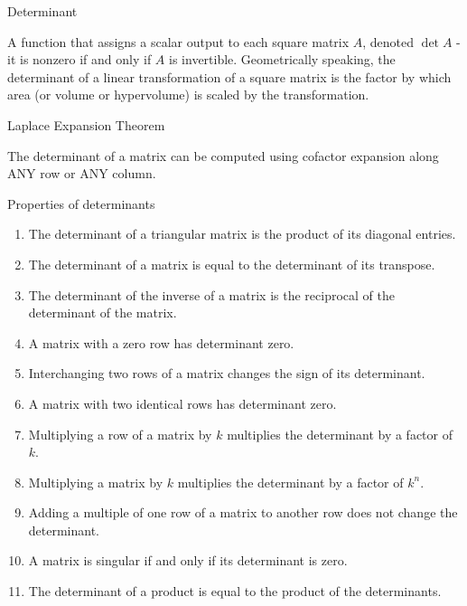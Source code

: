 \documentclass{ximera}
\begin{document}
Determinant
\begin{expandable}
    A function that assigns a scalar output to each square matrix $A$, denoted $\det A$ - it is nonzero if and only if $A$ is invertible.  Geometrically speaking, the determinant of a linear transformation of a square matrix is the factor by which area (or volume or hypervolume) is scaled by the transformation.
\end{expandable}


Laplace Expansion Theorem
\begin{expandable}
    The determinant of a matrix can be computed using cofactor expansion along ANY row or ANY column.
\end{expandable}


Properties of determinants
\begin{expandable}
\begin{enumerate}
    \item The determinant of a triangular matrix is the product of its diagonal entries.

    \item The determinant of a matrix is equal to the determinant of its transpose.

    \item The determinant of the inverse of a matrix is the reciprocal of the determinant of the matrix.

    \item A matrix with a zero row has determinant zero.

    \item Interchanging two rows of a matrix changes the sign of its determinant.

    \item A matrix with two identical rows has determinant zero.

    \item Multiplying a row of a matrix by $k$ multiplies the determinant by a factor of $k$.

    \item Multiplying a matrix by $k$ multiplies the determinant by a factor of $k^n$.

    \item Adding a multiple of one row of a matrix to another row does not change the determinant. 

    \item A matrix is singular if and only if its determinant is zero.

    \item The determinant of a product is equal to the product of the determinants.
\end{enumerate}
\end{expandable}

\end{document}
